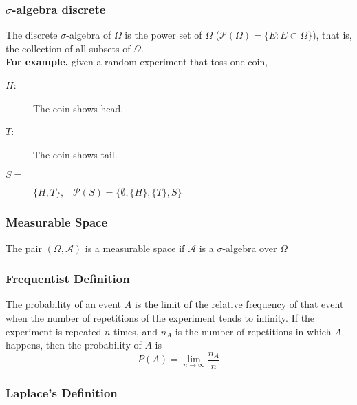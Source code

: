 \subsubsection{$\sigma$-algebra discrete} %
\label{ssub:_sigma_algebra_discrete}

The discrete $\sigma$-algebra of $\Omega$ is the power set of $\Omega$
($\mathcal{P}(\Omega)=\{E : E \subset \Omega\}$), that is, the collection of all
subsets of $\Omega$.\\

\textbf{For example,} given a random experiment that toss one coin,
\begin{description}
    \item[$H$:] The coin shows head.
    \item[$T$:] The coin shows tail. 
    \item[$S =$] $\{H, T\},\;\;\; \mathcal{P}(S)=\{\emptyset, \{H\}, \{T\}, S\}$
\end{description}

\subsubsection{Measurable Space} %
\label{ssub:measurable_space}

The pair $(\Omega, \mathcal{A})$ is a measurable space if $\mathcal{A}$ is a
$\sigma$-algebra over $\Omega$

\subsubsection{Frequentist Definition} %
\label{ssub:frequentist_definition}

The probability of an event $A$ is the limit of the relative frequency of that
event when the number of repetitions of the experiment tends to infinity. If the
experiment is repeated $n$ times, and $n_A$ is the number of repetitions in
which $A$ happens, then the probability of $A$ is
\begin{equation*}
    P(A) = \lim_{n \rightarrow \infty} \dfrac{n_A}{n}
\end{equation*}

\subsubsection{Laplace's Definition} %
\label{ssub:laplace_s_definition}

